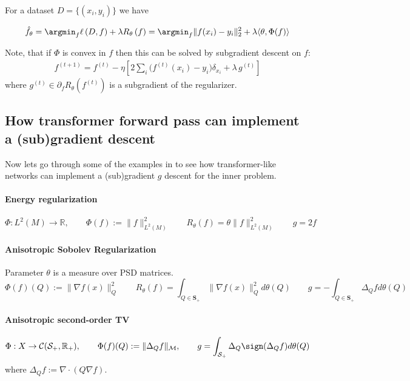 For a dataset $D = \{(x_i, y_i)\}$ we have

\begin{align*}
	\hat f_\theta = \argmin_f
	\ell\left(D,  f\right)
	+
	\lambda R_\theta\left(f\right)
	=
	\argmin_f
	\| f(x_i) - y_i\|_2^2
	+
	\lambda \langle \theta, \Phi(f) \rangle
\end{align*}

Note, that if $\Phi$ is convex in $f$ then this can be solved by subgradient descent on $f$:
\begin{align*}
	f^{(t+1)} = f^{(t)} - \eta \left[ 2\sum_i \bigl(f^{(t)}(x_i) - y_i\bigr) \delta_{x_i} + \lambda \, g^{(t)} \right]
\end{align*}
where $g^{(t)} \in \partial_f R_\theta(f^{(t)})$ is a subgradient of the regularizer.

\subsection{How transformer forward pass can implement a (sub)gradient descent}

Now lets go through some of the examples in 
to see how transformer-like networks can implement a (sub)gradient $g$ descent for the inner problem.

\paragraph{Energy regularization}

\[
	\Phi : L^2(M) \to \mathbb{R},
	\qquad
	\Phi(f) := \|f\|_{L^2(M)}^2 \qquad R_\theta(f) = \theta \|f\|_{L^2(M)}^2
	\qquad
	g = 2f
\]

\paragraph{Anisotropic Sobolev Regularization}
Parameter $\theta$ is a measure over PSD matrices.
\[
	\Phi(f)(Q) := \| \nabla f(x) \|^2_{Q} \qquad R_\theta(f) =  \int_{Q \in \mathbf{S}_+}\| \nabla f(x) \|^2_{Q}  d \theta(Q) \qquad g = - \int_{Q \in \mathbf{S}_+} \Delta_Q  f  d \theta(Q)
\]


\paragraph{Anisotropic second-order TV}

\[
	\Phi : X \to \mathcal C(\mathcal S_+,\mathbb{R}_+),
	\qquad
	\Phi(f)(Q) := \|\Delta_Q f\|_{\mathcal M},
	\qquad
	g = \int_{\mathcal S_+}  \Delta_Q \sign(\Delta_Q f) d\theta(Q)
\]
where $\Delta_Q f := \nabla\cdot(Q\nabla f)$.


